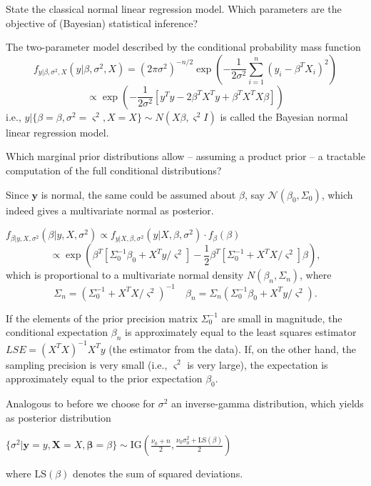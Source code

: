

State the classical normal linear regression model. Which parameters are the
objective of (Bayesian) statistical inference?

The two-parameter model described by the conditional probability mass function
\[
f_{y | \beta, \sigma^2, X}(y | \beta, \sigma^2, X) = (2\pi\sigma^2)^{-n/2} \exp \left( -\frac{1}{2\sigma^2} \sum_{i=1}^{n} (y_i - \beta^T X_i)^2 \right)
\]
\[
\propto \exp \left( -\frac{1}{2\sigma^2} [y^T y - 2\beta^T X^T y + \beta^T X^T X \beta] \right)
\]
i.e., \(y | \{\beta = \beta, \sigma^2 = \varsigma^2, X = X\} \sim N(X\beta, \varsigma^2 I)\) is called the Bayesian normal linear regression model.


Which marginal prior distributions allow – assuming a product prior – a tractable
computation of the full conditional distributions?

Since \( \mathbf{y} \) is normal, the same could be assumed about \( \mathbb{\beta} \), say \( \mathcal{N}(\beta_0, \Sigma_0) \), which indeed
gives a multivariate normal as posterior.

\(f_{\beta | y, X, \sigma^2}(\beta | y, X, \sigma^2) \propto f_{y | X, \beta, \sigma^2}(y | X, \beta, \sigma^2) \cdot f_{\beta}(\beta)\)
\[
\propto \exp \left( \beta^T [\Sigma_0^{-1} \beta_0 + X^T y / \varsigma^2] - \frac{1}{2} \beta^T [\Sigma_0^{-1} + X^T X / \varsigma^2] \beta \right),
\]
which is proportional to a multivariate normal density \(N(\beta_n, \Sigma_n)\), where
\[
\Sigma_n = (\Sigma_0^{-1} + X^T X / \varsigma^2)^{-1} \quad \beta_n = \Sigma_n (\Sigma_0^{-1} \beta_0 + X^T y / \varsigma^2).
\]

If the elements of the prior precision matrix \(\Sigma_0^{-1}\) are small in magnitude, the conditional expectation \(\beta_n\) is approximately 
equal to the least squares estimator \(LSE = (X^T X)^{-1} X^T y\) (the estimator from the data).
If, on the other hand, the sampling precision is very small (i.e., \(\varsigma^2\) is very large), the expectation is approximately 
equal to the prior expectation \(\beta_0\).

Analogous to before we choose for \( \sigma^2 \) an inverse-gamma distribution, which yields as posterior distribution 

\( \{ \sigma^2 | \mathbf{y} = y, \mathbf{X} = X, \mathbf{\beta} = \beta \} \sim \text{IG}(\frac{\nu_0 + n}{2}, \frac{\nu_0\sigma_0^2 + \text{LS}(\beta)}{2}) \)

where \(\text{LS}(\beta)\) denotes the sum of squared deviations.

